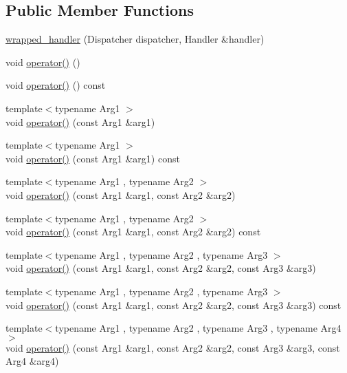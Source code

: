 \subsection*{Public Member Functions}
\begin{DoxyCompactItemize}
\item 
\hyperlink{classasio_1_1detail_1_1wrapped__handler_a6532a61de73b69ef7bde001ca7f48158}{wrapped\+\_\+handler} (Dispatcher dispatcher, Handler \&handler)
\item 
void \hyperlink{classasio_1_1detail_1_1wrapped__handler_a5bc3d2fd5954514947d5de6bab4ba37f}{operator()} ()
\item 
void \hyperlink{classasio_1_1detail_1_1wrapped__handler_a3bd948a1c83c9e5ec3f76e0dc401e83f}{operator()} () const 
\item 
{\footnotesize template$<$typename Arg1 $>$ }\\void \hyperlink{classasio_1_1detail_1_1wrapped__handler_a703b92a5ec9bf18c11fcf15eb2679392}{operator()} (const Arg1 \&arg1)
\item 
{\footnotesize template$<$typename Arg1 $>$ }\\void \hyperlink{classasio_1_1detail_1_1wrapped__handler_aee5dd38e7d3dbf85af766953422bc86a}{operator()} (const Arg1 \&arg1) const 
\item 
{\footnotesize template$<$typename Arg1 , typename Arg2 $>$ }\\void \hyperlink{classasio_1_1detail_1_1wrapped__handler_a793678ebf585482e2c0b9ff7f2b6a88e}{operator()} (const Arg1 \&arg1, const Arg2 \&arg2)
\item 
{\footnotesize template$<$typename Arg1 , typename Arg2 $>$ }\\void \hyperlink{classasio_1_1detail_1_1wrapped__handler_a1af3387159b55c08a7636d26f4219954}{operator()} (const Arg1 \&arg1, const Arg2 \&arg2) const 
\item 
{\footnotesize template$<$typename Arg1 , typename Arg2 , typename Arg3 $>$ }\\void \hyperlink{classasio_1_1detail_1_1wrapped__handler_ae9632d106be9efaf2e85dc88789309e3}{operator()} (const Arg1 \&arg1, const Arg2 \&arg2, const Arg3 \&arg3)
\item 
{\footnotesize template$<$typename Arg1 , typename Arg2 , typename Arg3 $>$ }\\void \hyperlink{classasio_1_1detail_1_1wrapped__handler_a91681be6d3346d4611bc0b81ca666e82}{operator()} (const Arg1 \&arg1, const Arg2 \&arg2, const Arg3 \&arg3) const 
\item 
{\footnotesize template$<$typename Arg1 , typename Arg2 , typename Arg3 , typename Arg4 $>$ }\\void \hyperlink{classasio_1_1detail_1_1wrapped__handler_aa1e1f18ab92f4cc2d3921e94323bf206}{operator()} (const Arg1 \&arg1, const Arg2 \&arg2, const Arg3 \&arg3, const Arg4 \&arg4)

\end{DoxyCompactItemize}
